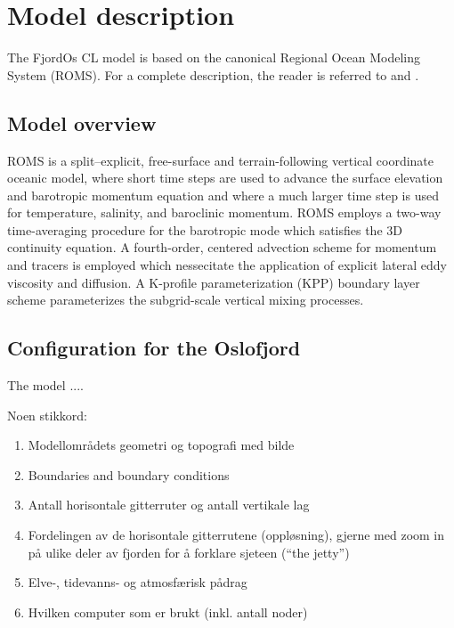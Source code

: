 \section{Model description}
\label{sec:overv}
The FjordOs CL model is based on the canonical Regional Ocean Modeling System (ROMS). For a complete description, the reader is referred to  \cite{haidv:etal:2008} and \cite{shche:mcwil:2003, shche:mcwil:2005, shche:mcwil:2009}. 

\subsection{Model overview}
ROMS is a split–explicit, free-surface and terrain-following vertical coordinate oceanic model, where short time steps are used to advance the surface elevation and barotropic momentum equation and where a much larger time step is used for temperature, salinity, and baroclinic momentum. ROMS employs a two-way time-averaging procedure for the barotropic mode which satisfies the 3D continuity equation. A fourth-order, centered advection scheme for momentum and tracers is employed which nessecitate the application of explicit lateral eddy viscosity and diffusion. A K-profile parameterization (KPP) boundary layer scheme \cite{large:etal:1994} parameterizes the subgrid-scale vertical mixing processes. 

\subsection{Configuration for the Oslofjord}
The model .... 

Noen stikkord:
\begin{enumerate} 
 \item Modellområdets geometri og topografi med bilde
 \item Boundaries and boundary conditions
 \item Antall horisontale gitterruter og antall vertikale lag
 \item Fordelingen av de horisontale gitterrutene (oppløsning), gjerne med zoom in på ulike deler av fjorden for å forklare sjeteen (``the jetty'')
 \item Elve-, tidevanns- og atmosfærisk pådrag
 \item Hvilken computer som er brukt (inkl. antall noder)
\end{enumerate} 

